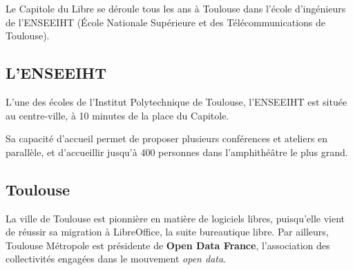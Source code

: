 
Le Capitole du Libre se déroule tous les ans à Toulouse dans l'école
 d'ingénieurs de l'ENSEEIHT (École Nationale Supérieure
 et des Télécommunications de Toulouse). 

\subsection{L'ENSEEIHT}

L'une des écoles de l'Institut Polytechnique de Toulouse, l'ENSEEIHT
 est située au centre-ville, à 10 minutes de la place du Capitole.

Sa capacité d'accueil permet de proposer plusieurs conférences et
 ateliers en parallèle, et d'accueillir jusqu'à 400 personnes dans
 l'amphithéâtre le plus grand.

\subsection{Toulouse}

La ville de Toulouse est pionnière en matière de logiciels libres,
 puisqu'elle vient de réussir sa migration à LibreOffice, la suite
 bureautique libre. Par ailleurs, Toulouse Métropole est présidente de
 \textbf{Open Data France}, l'association des collectivités
 engagées dans le mouvement \textit{open data}.

